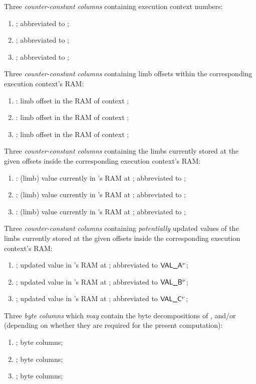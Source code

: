 Three \emph{counter-constant columns} containing execution context numbers:
\begin{enumerate}
	\item \CNA{}; abbreviated to \cnA{};
	\item \CNB{}; abbreviated to \cnB{};
	\item \CNC{}; abbreviated to \cnC{};
\end{enumerate}
Three \emph{counter-constant columns} containing limb offsets within the corresponding execution context's RAM:
\begin{enumerate}[resume]
	\item \indexA{}: limb offset in the RAM of context \cnA{};
	\item \indexB{}: limb offset in the RAM of context \cnB{};
	\item \indexC{}: limb offset in the RAM of context \cnC{};
\end{enumerate}
Three \emph{counter-constant columns} containing the limbs currently stored at the given offsets inside the corresponding execution context's RAM:
\begin{enumerate}[resume]
	\item \VALA{}: (limb) value currently in \cnA{}'s RAM at \indexA{}; abbreviated to \valA{};
	\item \VALB{}: (limb) value currently in \cnB{}'s RAM at \indexB{}; abbreviated to \valB{};
	\item \VALC{}: (limb) value currently in \cnC{}'s RAM at \indexC{}; abbreviated to \valC{};
\end{enumerate}
Three \emph{counter-constant columns} containing \emph{potentially} updated values of the limbs currently stored at the given offsets inside the corresponding execution context's RAM:
\begin{enumerate}[resume]
	\item \VALANEW{}; updated value in \cnA{}'s RAM at \indexA{}; abbreviated to $\textsf{VAL\_A}{}^{\nu}$;
	\item \VALBNEW{}; updated value in \cnB{}'s RAM at \indexB{}; abbreviated to $\textsf{VAL\_B}{}^{\nu}$;
	\item \VALCNEW{}; updated value in \cnC{}'s RAM at \indexC{}; abbreviated to $\textsf{VAL\_C}{}^{\nu}$;
\end{enumerate}
Three \emph{byte columns} which \emph{may} contain the byte decompositions of \valA{}, \valB{} and/or \valC{} (depending on whether they are required for the present computation):
\begin{enumerate}[resume]
	\item \BYTEA{}; byte columns; %
	\item \BYTEB{}; byte columns; %
	\item \BYTEC{}; byte columns; %
\end{enumerate}
